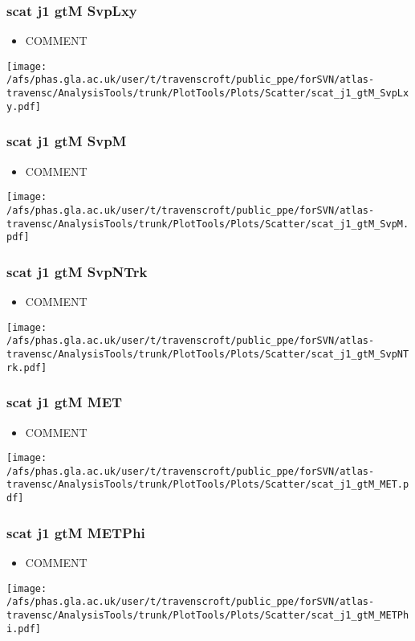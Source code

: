 \documentclass{beamer}
\begin{document}
\begin{frame}
\frametitle{scat j1 gtM SvpLxy}
\begin{itemize}
\item COMMENT
\end{itemize}
\begin{center}
\texttt{[image: /afs/phas.gla.ac.uk/user/t/travenscroft/public\_ppe/forSVN/atlas-travensc/AnalysisTools/trunk/PlotTools/Plots/Scatter/scat\_j1\_gtM\_SvpLxy.pdf]}
\end{center}
\end{frame}

\begin{frame}
\frametitle{scat j1 gtM SvpM}
\begin{itemize}
\item COMMENT
\end{itemize}
\begin{center}
\texttt{[image: /afs/phas.gla.ac.uk/user/t/travenscroft/public\_ppe/forSVN/atlas-travensc/AnalysisTools/trunk/PlotTools/Plots/Scatter/scat\_j1\_gtM\_SvpM.pdf]}
\end{center}
\end{frame}

\begin{frame}
\frametitle{scat j1 gtM SvpNTrk}
\begin{itemize}
\item COMMENT
\end{itemize}
\begin{center}
\texttt{[image: /afs/phas.gla.ac.uk/user/t/travenscroft/public\_ppe/forSVN/atlas-travensc/AnalysisTools/trunk/PlotTools/Plots/Scatter/scat\_j1\_gtM\_SvpNTrk.pdf]}
\end{center}
\end{frame}

\begin{frame}
\frametitle{scat j1 gtM MET}
\begin{itemize}
\item COMMENT
\end{itemize}
\begin{center}
\texttt{[image: /afs/phas.gla.ac.uk/user/t/travenscroft/public\_ppe/forSVN/atlas-travensc/AnalysisTools/trunk/PlotTools/Plots/Scatter/scat\_j1\_gtM\_MET.pdf]}
\end{center}
\end{frame}

\begin{frame}
\frametitle{scat j1 gtM METPhi}
\begin{itemize}
\item COMMENT
\end{itemize}
\begin{center}
\texttt{[image: /afs/phas.gla.ac.uk/user/t/travenscroft/public\_ppe/forSVN/atlas-travensc/AnalysisTools/trunk/PlotTools/Plots/Scatter/scat\_j1\_gtM\_METPhi.pdf]}
\end{center}
\end{frame}
\end{document}
